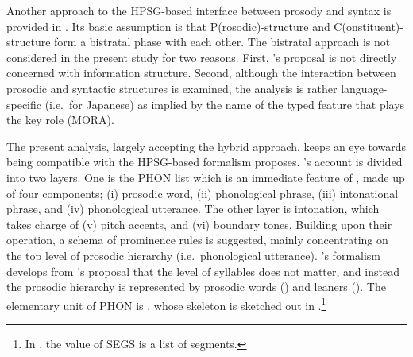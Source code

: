 \largerpage[2]
Another approach to the HPSG-based interface between prosody and
syntax is provided in \citet{yoshimoto:00}. Its basic
assumption is that P(rosodic)-structure and C(onstituent)-structure
form a bistratal phase with each other. The bistratal approach is not
considered in the present study for two reasons. First,
\citeauthor{yoshimoto:00}'s proposal is not directly concerned with
information structure. Second, although the interaction between
prosodic and syntactic structures is examined, the analysis is rather
language-specific (i.e.\ for Japanese) as implied by the name of the
typed feature that plays the key role (MORA).



The present analysis, largely accepting the hybrid approach, keeps an
eye towards being compatible with the HPSG-based formalism
\citet{bildhauer:07} proposes.  \citeauthor{bildhauer:07}'s account is
divided into two layers. One is the PHON list which is an immediate
feature of , made up of four components; (i) prosodic word,
(ii) phonological phrase, (iii) intonational phrase, and (iv)
phonological utterance. The other layer is intonation, which takes
charge of (v) pitch accents, and (vi) boundary
tones. Building upon their operation, a schema of  prominence
rules is suggested, mainly concentrating on the top level of prosodic
hierarchy (i.e.\ phonological utterance). \citeauthor{bildhauer:07}'s
formalism develops from \citeauthor{klein:00}'s proposal that the
level of syllables does not matter, and instead the prosodic hierarchy
is represented by prosodic words () and leaners
(). The elementary unit of PHON is , whose skeleton
is sketched out in 
\citep[161]{bildhauer:07}.\footnote{In
  , the value of SEGS is a list of
  segments.}



